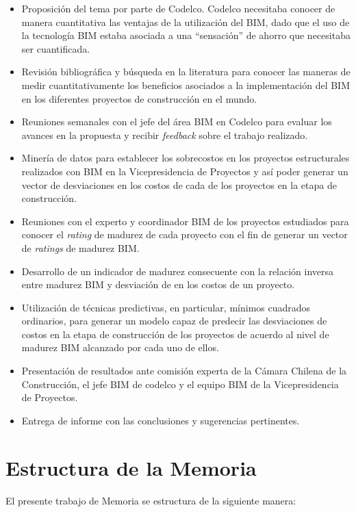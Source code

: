\begin{itemize}
    \item Proposición del tema por parte de Codelco. Codelco necesitaba conocer de manera cuantitativa las ventajas de la utilización del BIM, dado que el uso de la tecnología BIM estaba asociada a una ``sensación'' de ahorro que necesitaba ser cuantificada.
    \item Revisión bibliográfica y búsqueda en la literatura para conocer las maneras de medir cuantitativamente los beneficios asociados a la implementación del BIM en los diferentes proyectos de construcción en el mundo.
    \item Reuniones semanales con el jefe del área BIM en Codelco para evaluar los avances en la propuesta y recibir \emph{feedback} sobre el trabajo realizado.
    \item Minería de datos para establecer los sobrecostos en los proyectos estructurales realizados con BIM en la Vicepresidencia de Proyectos y así poder generar un vector de desviaciones en los costos de cada de los proyectos en la etapa de construcción.
    \item Reuniones con el experto y coordinador BIM de los proyectos estudiados para conocer el \emph{rating} de madurez de cada proyecto con el fin de generar un vector de \emph{ratings} de madurez BIM.
    \item Desarrollo de un indicador de madurez consecuente con la relación inversa entre madurez BIM y desviación de en los costos de un proyecto.
    \item Utilización de técnicas predictivas, en particular, mínimos cuadrados ordinarios, para generar un modelo capaz de predecir las desviaciones de costos en la etapa de construcción de los proyectos de acuerdo al nivel de madurez BIM alcanzado por cada uno de ellos.
    \item Presentación de resultados ante comisión experta de la Cámara Chilena de la Construcción, el jefe BIM de codelco y el equipo BIM de la Vicepresidencia de Proyectos.
    \item Entrega de informe con las conclusiones y sugerencias pertinentes.
\end{itemize}

\section{Estructura de la Memoria}

El presente trabajo de Memoria se estructura de la siguiente manera:

